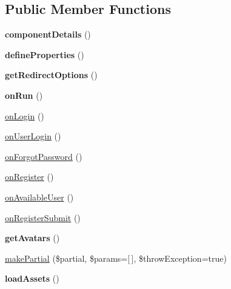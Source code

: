\subsection*{Public Member Functions}
\begin{DoxyCompactItemize}
\item 
\hypertarget{classDMA_1_1Friends_1_1Components_1_1UserLogin_acdfe6ac44ada2b3cfd131e0529e939bf}{}{\bfseries component\+Details} ()\label{classDMA_1_1Friends_1_1Components_1_1UserLogin_acdfe6ac44ada2b3cfd131e0529e939bf}

\item 
\hypertarget{classDMA_1_1Friends_1_1Components_1_1UserLogin_aed0e2d9c2a568fa59e91b24d2c920639}{}{\bfseries define\+Properties} ()\label{classDMA_1_1Friends_1_1Components_1_1UserLogin_aed0e2d9c2a568fa59e91b24d2c920639}

\item 
\hypertarget{classDMA_1_1Friends_1_1Components_1_1UserLogin_af4bf91673455e94e2af6807fcc7535cf}{}{\bfseries get\+Redirect\+Options} ()\label{classDMA_1_1Friends_1_1Components_1_1UserLogin_af4bf91673455e94e2af6807fcc7535cf}

\item 
\hypertarget{classDMA_1_1Friends_1_1Components_1_1UserLogin_a0820819b4447a5279432463d42d7a4e6}{}{\bfseries on\+Run} ()\label{classDMA_1_1Friends_1_1Components_1_1UserLogin_a0820819b4447a5279432463d42d7a4e6}

\item 
\hyperlink{classDMA_1_1Friends_1_1Components_1_1UserLogin_ae62d795e0eb073ab1e9b6e74425a04a7}{on\+Login} ()
\item 
\hyperlink{classDMA_1_1Friends_1_1Components_1_1UserLogin_a9f64120e2a98aca7bb6ad628d9a72844}{on\+User\+Login} ()
\item 
\hyperlink{classDMA_1_1Friends_1_1Components_1_1UserLogin_a232f43a38ed3fcdb7ebf6c774b031496}{on\+Forgot\+Password} ()
\item 
\hyperlink{classDMA_1_1Friends_1_1Components_1_1UserLogin_a61008348cecd24a9b01b20aeebc04b4b}{on\+Register} ()
\item 
\hyperlink{classDMA_1_1Friends_1_1Components_1_1UserLogin_a49b72261eed4c7750ca24e23ebecc945}{on\+Available\+User} ()
\item 
\hyperlink{classDMA_1_1Friends_1_1Components_1_1UserLogin_adb35ec3a5460d1a197337104a54b55b1}{on\+Register\+Submit} ()
\item 
\hypertarget{classDMA_1_1Friends_1_1Components_1_1UserLogin_a5390d4ee17957bf8df7209892cfdadb0}{}{\bfseries get\+Avatars} ()\label{classDMA_1_1Friends_1_1Components_1_1UserLogin_a5390d4ee17957bf8df7209892cfdadb0}

\item 
\hyperlink{classDMA_1_1Friends_1_1Components_1_1UserLogin_a5845beab2a28f2a742da61b23a680eda}{make\+Partial} (\$partial, \$params=\mbox{[}$\,$\mbox{]}, \$throw\+Exception=true)
\item 
\hypertarget{classDMA_1_1Friends_1_1Components_1_1UserLogin_a58168b62fe7af6d5c5a70c3cd83c9707}{}{\bfseries load\+Assets} ()\label{classDMA_1_1Friends_1_1Components_1_1UserLogin_a58168b62fe7af6d5c5a70c3cd83c9707}

\end{DoxyCompactItemize}
